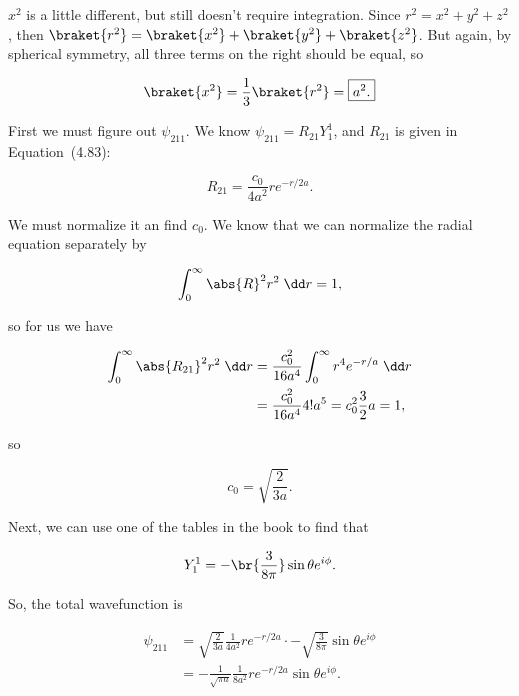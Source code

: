 \begin{parts}
$x^2$ is a little different, but still doesn't require integration. Since $r^2 = x^2+y^2+z^2$, then $\braket{r^2} = \braket{x^2} + \braket{y^2} + \braket{z^2}$. But again, by spherical symmetry, all three terms on the right should be equal, so

\begin{equation}
    \braket{x^2} = \frac{1}{3}\braket{r^2} = \boxed{a^2.}
\end{equation}



\item First we must figure out $\psi_{211}$. We know $\psi_{211} = R_{21}Y^1_1$, and $R_{21}$ is given in Equation~(4.83):

\begin{equation}
    R_{21} = \frac{c_0}{4a^2}re^{-r/2a}.
\end{equation}

We must normalize it an find $c_0$. We know that we can normalize the radial equation separately by

\begin{equation}
    \int_0^{\infty} \abs{R}^2r^2 \;\dd r = 1,
\end{equation}

so for us we have

\begin{align}
    \int_0^{\infty} \abs{R_{21}}^2 r^2 \;\dd r &= \frac{c_0^2}{16a^4} \int_0^{\infty}r^4e^{-r/a}\;\dd r \\ 
    &= \frac{c_0^2}{16a^4} 4! a^5 = c_0^2 \frac{3}{2}a = 1,
\end{align}

so

\begin{equation}
    c_0 = \sqrt{\frac{2}{3a}}.
\end{equation}

Next, we can use one of the tables in the book to find that

\begin{equation}
    Y_1^1 = -\br{\frac{3}{8\pi}}\sin\theta e^{i\phi}.
\end{equation}

So, the total wavefunction is

\begin{align}
    \psi_{211} &= \sqrt{\frac{2}{3a}}\frac{1}{4a^2}re^{-r/2a} \cdot -\sqrt{\frac{3}{8\pi}}\sin\theta e^{i\phi} \\
    &= -\frac{1}{\sqrt{\pi a}}\frac{1}{8a^2}r e^{-r/2a} \sin\theta e^{i\phi}.
\end{align}


\end{parts}
